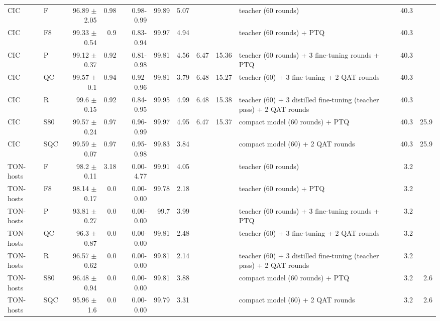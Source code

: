 \documentclass[10pt]{article}
\begin{document}
{\begin{longtable}{llrrrrrrrlrr}
CIC & F & 96.89 $\pm$ 2.05 & 0.98 & 0.98-0.99 & 99.89 & 5.07 &  &  & teacher (60 rounds) & 40.3 &  \\
CIC & F8 & 99.33 $\pm$ 0.54 & 0.9 & 0.83-0.94 & 99.97 & 4.94 &  &  & teacher (60 rounds) + PTQ & 40.3 &  \\
CIC & P & 99.12 $\pm$ 0.37 & 0.92 & 0.81-0.98 & 99.81 & 4.56 & 6.47 & 15.36 & teacher (60 rounds) + 3 fine-tuning rounds + PTQ & 40.3 &  \\
CIC & QC & 99.57 $\pm$ 0.1 & 0.94 & 0.92-0.96 & 99.81 & 3.79 & 6.48 & 15.27 & teacher (60) + 3 fine-tuning + 2 QAT rounds & 40.3 &  \\
CIC & R & 99.6 $\pm$ 0.15 & 0.92 & 0.84-0.95 & 99.95 & 4.99 & 6.48 & 15.38 & teacher (60) + 3 distilled fine-tuning (teacher pass) + 2 QAT rounds & 40.3 &  \\
CIC & S80 & 99.57 $\pm$ 0.24 & 0.97 & 0.96-0.99 & 99.97 & 4.95 & 6.47 & 15.37 & compact model (60 rounds) + PTQ & 40.3 & 25.9 \\
CIC & SQC & 99.59 $\pm$ 0.07 & 0.97 & 0.95-0.98 & 99.83 & 3.84 &  &  & compact model (60) + 2 QAT rounds & 40.3 & 25.9 \\
TON-hosts & F & 98.2 $\pm$ 0.11 & 3.18 & 0.00-4.77 & 99.91 & 4.05 &  &  & teacher (60 rounds) & 3.2 &  \\
TON-hosts & F8 & 98.14 $\pm$ 0.17 & 0.0 & 0.00-0.00 & 99.78 & 2.18 &  &  & teacher (60 rounds) + PTQ & 3.2 &  \\
TON-hosts & P & 93.81 $\pm$ 0.27 & 0.0 & 0.00-0.00 & 99.7 & 3.99 &  &  & teacher (60 rounds) + 3 fine-tuning rounds + PTQ & 3.2 &  \\
TON-hosts & QC & 96.3 $\pm$ 0.87 & 0.0 & 0.00-0.00 & 99.81 & 2.48 &  &  & teacher (60) + 3 fine-tuning + 2 QAT rounds & 3.2 &  \\
TON-hosts & R & 96.57 $\pm$ 0.62 & 0.0 & 0.00-0.00 & 99.81 & 2.14 &  &  & teacher (60) + 3 distilled fine-tuning (teacher pass) + 2 QAT rounds & 3.2 &  \\
TON-hosts & S80 & 96.48 $\pm$ 0.94 & 0.0 & 0.00-0.00 & 99.81 & 3.88 &  &  & compact model (60 rounds) + PTQ & 3.2 & 2.6 \\
TON-hosts & SQC & 95.96 $\pm$ 1.6 & 0.0 & 0.00-0.00 & 99.79 & 3.31 &  &  & compact model (60) + 2 QAT rounds & 3.2 & 2.6 \\
\end{longtable}}
\end{document}
